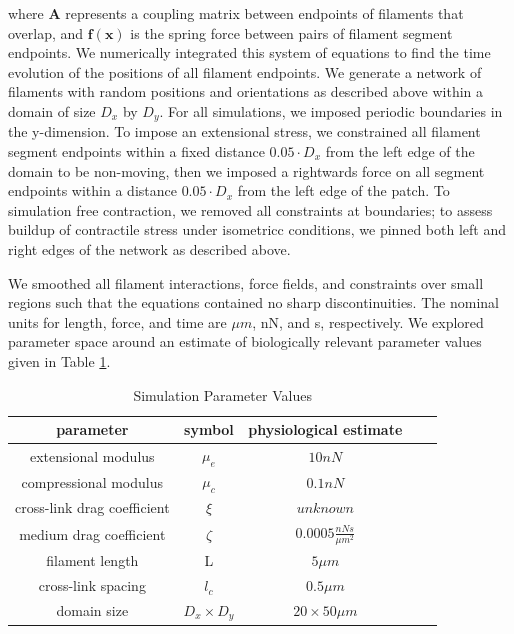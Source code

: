 \documentclass[10pt,letterpaper]{article}
\begin{document}
where $\mathbf{A }$ represents a coupling matrix between endpoints of filaments that overlap, and $\mathbf{f(x)}$ is the spring force between pairs of filament segment endpoints.   We numerically integrated this system of equations to find the time evolution of the positions of all filament endpoints. We generate a network of filaments with random positions and orientations as described above within a domain of size $D_x$ by $D_y$.  For all simulations, we imposed periodic boundaries in the y-dimension. To impose an extensional stress, we constrained all filament segment endpoints within a fixed distance $0.05\cdot D_x$ from the left edge of the domain to be non-moving, then we imposed a rightwards force on all segment endpoints within a distance $0.05\cdot D_x$ from the left edge of the patch.   To simulation free contraction, we removed all constraints at boundaries; to assess buildup of contractile stress under isometricc conditions, we pinned both left and right edges of the network as described above.




We smoothed all filament interactions, force fields, and constraints over small regions such that the equations contained no sharp discontinuities. The nominal units for length, force, and time are $\mu m$, nN, and s, respectively.  We explored parameter space around an estimate of biologically relevant parameter values given in Table \ref{table:para}. 

\begin{table}[h]
\centering
\caption{Simulation Parameter Values}
\label{table:para}
\begin{tabular}{|c|c|c|c|c|}
\hline
{\bf parameter}             & {\bf symbol} & {\bf physiological estimate}          \\ \hline
extensional modulus         & $\mu_e$        & $10 nN $                                               \\
compressional modulus             & $\mu_c$     & $ 0.1 nN $                           \\
cross-link drag coefficient & $\xi$      & $unknown $              \\
medium drag coefficient     & $\zeta$        & $0.0005 \frac{nN s}{\mu m^2} $      \\
filament length             & L            & $5 \mu m$                                          \\
cross-link spacing          & $l_c$        & $0.5 \mu m$                                         \\
domain size                 & $D_x\times D_y$            & $20\times 50 \mu m$                                 \\ \hline
\end{tabular}
\end{table}
\end{document}
